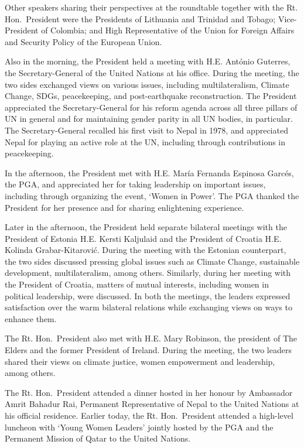 \documentclass[
  openany]{book}
\begin{document}
Other speakers sharing their perspectives at the roundtable together with the Rt. Hon.~President were the Presidents of Lithuania and Trinidad and Tobago; Vice-President of Colombia; and High Representative of the Union for Foreign Affairs and Security Policy of the European Union.

Also in the morning, the President held a meeting with H.E. António Guterres, the Secretary-General of the United Nations at his office. During the meeting, the two sides exchanged views on various issues, including multilateralism, Climate Change, SDGs, peacekeeping, and post-earthquake reconstruction. The President appreciated the Secretary-General for his reform agenda across all three pillars of UN in general and for maintaining gender parity in all UN bodies, in particular. The Secretary-General recalled his first visit to Nepal in 1978, and appreciated Nepal for playing an active role at the UN, including through contributions in peacekeeping.

In the afternoon, the President met with H.E. María Fernanda Espinosa Garcés, the PGA, and appreciated her for taking leadership on important issues, including through organizing the event, `Women in Power'. The PGA thanked the President for her presence and for sharing enlightening experience.

Later in the afternoon, the President held separate bilateral meetings with the President of Estonia H.E. Kersti Kaljulaid and the President of Croatia H.E. Kolinda Grabar-Kitarović. During the meeting with the Estonian counterpart, the two sides discussed pressing global issues such as Climate Change, sustainable development, multilateralism, among others. Similarly, during her meeting with the President of Croatia, matters of mutual interests, including women in political leadership, were discussed. In both the meetings, the leaders expressed satisfaction over the warm bilateral relations while exchanging views on ways to enhance them.

The Rt. Hon.~President also met with H.E. Mary Robinson, the president of The Elders and the former President of Ireland. During the meeting, the two leaders shared their views on climate justice, women empowerment and leadership, among others.

The Rt. Hon.~President attended a dinner hosted in her honour by Ambassador Amrit Bahadur Rai, Permanent Representative of Nepal to the United Nations at his official residence. Earlier today, the Rt. Hon.~President attended a high-level luncheon with `Young Women Leaders' jointly hosted by the PGA and the Permanent Mission of Qatar to the United Nations.
\end{document}

